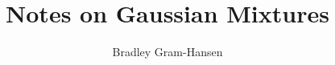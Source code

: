 \documentclass[]{scrartcl}
\title{Notes on Gaussian Mixtures}
\author{Bradley Gram-Hansen}
\begin{document}
\maketitle

\begin{abstract}

\end{abstract}


\end{document}
